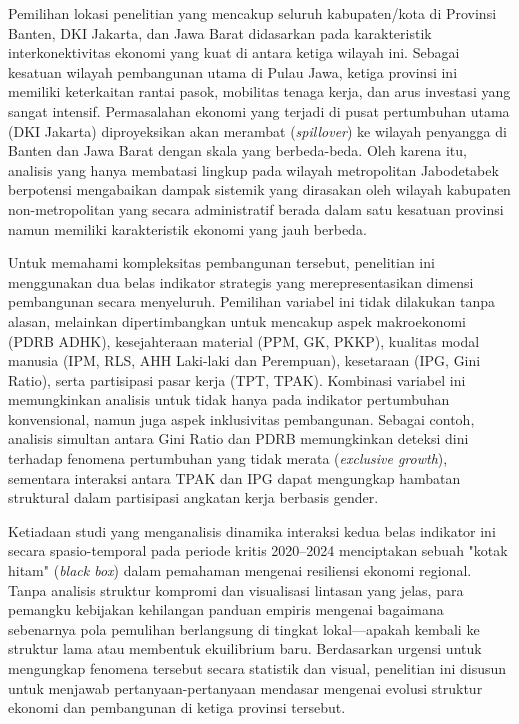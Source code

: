 \documentclass[a4paper]{article}
\theoremstyle{definition} %
\begin{document}
Pemilihan lokasi penelitian yang mencakup seluruh kabupaten/kota di Provinsi Banten, DKI Jakarta, dan Jawa Barat didasarkan pada karakteristik interkonektivitas ekonomi yang kuat di antara ketiga wilayah ini. Sebagai kesatuan wilayah pembangunan utama di Pulau Jawa, ketiga provinsi ini memiliki keterkaitan rantai pasok, mobilitas tenaga kerja, dan arus investasi yang sangat intensif. Permasalahan ekonomi yang terjadi di pusat pertumbuhan utama (DKI Jakarta) diproyeksikan akan merambat (\textit{spillover}) ke wilayah penyangga di Banten dan Jawa Barat dengan skala yang berbeda-beda. Oleh karena itu, analisis yang hanya membatasi lingkup pada wilayah metropolitan Jabodetabek berpotensi mengabaikan dampak sistemik yang dirasakan oleh wilayah kabupaten non-metropolitan yang secara administratif berada dalam satu kesatuan provinsi namun memiliki karakteristik ekonomi yang jauh berbeda.

Untuk memahami kompleksitas pembangunan tersebut, penelitian ini menggunakan dua belas indikator strategis yang merepresentasikan dimensi pembangunan secara menyeluruh. Pemilihan variabel ini tidak dilakukan tanpa alasan, melainkan dipertimbangkan untuk mencakup aspek makroekonomi (PDRB ADHK), kesejahteraan material (PPM, GK, PKKP), kualitas modal manusia (IPM, RLS, AHH Laki-laki dan Perempuan), kesetaraan (IPG, Gini Ratio), serta partisipasi pasar kerja (TPT, TPAK). Kombinasi variabel ini memungkinkan analisis untuk tidak hanya pada indikator pertumbuhan konvensional, namun juga aspek inklusivitas pembangunan. Sebagai contoh, analisis simultan antara Gini Ratio dan PDRB memungkinkan deteksi dini terhadap fenomena pertumbuhan yang tidak merata (\textit{exclusive growth}), sementara interaksi antara TPAK dan IPG dapat mengungkap hambatan struktural dalam partisipasi angkatan kerja berbasis gender.

Ketiadaan studi yang menganalisis dinamika interaksi kedua belas indikator ini secara spasio-temporal pada periode kritis 2020--2024 menciptakan sebuah "kotak hitam" (\textit{black box}) dalam pemahaman mengenai resiliensi ekonomi regional. Tanpa analisis struktur kompromi dan visualisasi lintasan yang jelas, para pemangku kebijakan kehilangan panduan empiris mengenai bagaimana sebenarnya pola pemulihan berlangsung di tingkat lokal—apakah kembali ke struktur lama atau membentuk ekuilibrium baru. Berdasarkan urgensi untuk mengungkap fenomena tersebut secara statistik dan visual, penelitian ini disusun untuk menjawab pertanyaan-pertanyaan mendasar mengenai evolusi struktur ekonomi dan pembangunan di ketiga provinsi tersebut.
\end{document}
